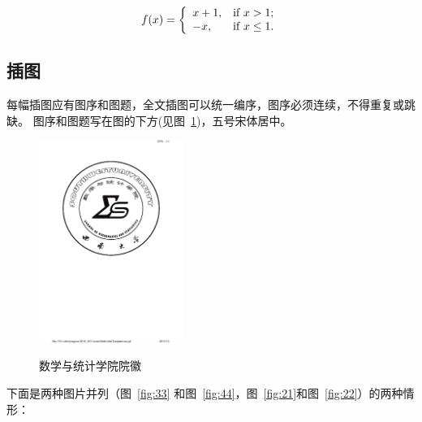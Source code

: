 \[
f(x) =  \left\{
  \begin{array}{ll}
    x+1, & \hbox{if $x>1$;} \\
    -x, & \hbox{if $x\leq 1$.}
  \end{array}
\right.
\]
\makeatother
\subsection{插图}
每幅插图应有图序和图题，全文插图可以统一编序，图序必须连续，不得重复或跳缺。
图序和图题写在图的下方(见图~\ref{fig:1})，五号宋体居中。
\begin{figure}
\centering
\includegraphics[height=6.6cm,angle=0]{preample/ms}\\
\caption{数学与统计学院院徽}\label{fig:1}
\end{figure}
下面是两种图片并列（图~\ref{fig:33} 和图~\ref{fig:44}，图~\ref{fig:21}和图~\ref{fig:22}）的两种情形：
